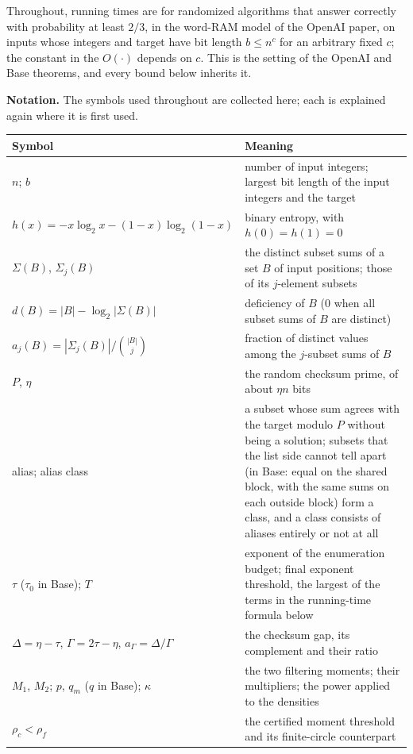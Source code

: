 \documentclass[11pt]{article}
\theoremstyle{plain}
\begin{document}
Throughout, running times are for randomized algorithms that answer correctly with probability at least $2/3$, in the word-RAM model of the OpenAI paper, on inputs whose integers and target have bit length $b \le n^c$ for an arbitrary fixed $c$; the constant in the $O(\cdot)$ depends on $c$. This is the setting of the OpenAI and Base theorems, and every bound below inherits it.

\textbf{Notation.} The symbols used throughout are collected here; each is explained again where it is first used.

\begin{center}
\small
\begin{tabularx}{\linewidth}{>{\raggedright\arraybackslash}p{4.4cm} L}
\toprule
Symbol & Meaning \\
\midrule
$n$; $b$ & number of input integers; largest bit length of the input integers and the target \\
$h(x) = -x\log_2 x - (1-x)\log_2(1-x)$ & binary entropy, with $h(0) = h(1) = 0$ \\
$\Sigma(B)$, $\Sigma_j(B)$ & the distinct subset sums of a set $B$ of input positions; those of its $j$-element subsets \\
$d(B) = |B| - \log_2|\Sigma(B)|$ & deficiency of $B$ (0 when all subset sums of $B$ are distinct) \\
$a_j(B) = |\Sigma_j(B)|/\binom{|B|}{j}$ & fraction of distinct values among the $j$-subset sums of $B$ \\
$P$, $\eta$ & the random checksum prime, of about $\eta n$ bits \\
alias; alias class & a subset whose sum agrees with the target modulo $P$ without being a solution; subsets that the list side cannot tell apart (in Base: equal on the shared block, with the same sums on each outside block) form a class, and a class consists of aliases entirely or not at all \\
$\tau$ ($\tau_0$ in Base); $T$ & exponent of the enumeration budget; final exponent threshold, the largest of the terms in the running-time formula below \\
$\Delta = \eta - \tau$, $\Gamma = 2\tau - \eta$, $a_\Gamma = \Delta/\Gamma$ & the checksum gap, its complement and their ratio \\
$M_1$, $M_2$; $p$, $q_m$ ($q$ in Base); $\kappa$ & the two filtering moments; their multipliers; the power applied to the densities \\
$\rho_c < \rho_f$ & the certified moment threshold and its finite-circle counterpart \\

\end{tabularx}
\end{center}
\end{document}
